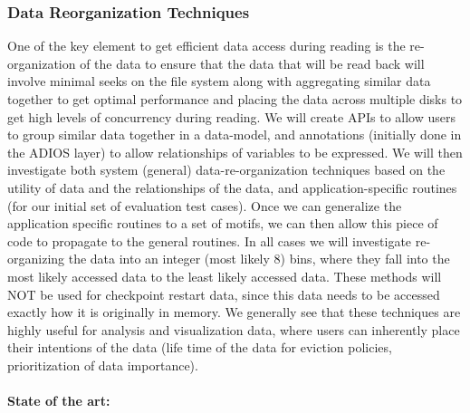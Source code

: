 \subsubsection{Data Reorganization Techniques}
One of the key element to get efficient data access during reading is the re-organization of the
data to ensure that the data that will be read back will involve minimal seeks on the file system 
along with aggregating similar data together to get optimal performance and placing the data
across multiple disks to get high levels of concurrency during reading. We will create APIs to
allow users to group similar data together in a data-model, and annotations (initially done in the
ADIOS layer) to allow relationships of variables to be expressed. We will then investigate both
system (general) data-re-organization techniques based on the utility of data and the relationships
of the data, and application-specific routines (for our initial set of evaluation test cases).  Once
we can generalize the application specific routines to a set of motifs, we can then allow this piece
of code to propagate to the general routines. In all cases we will investigate re-organizing the data
into an integer (most likely 8) bins, where they fall into the most likely accessed data to the least
likely accessed data. These methods will NOT be used for checkpoint restart data, since this
data needs to be accessed exactly how it is originally in memory.  We generally see that these
techniques are highly useful for analysis and  visualization data, where users can inherently place
their intentions of the data (life time of the data for eviction policies, prioritization of data 
importance). 


\paragraph{State of the art:}

